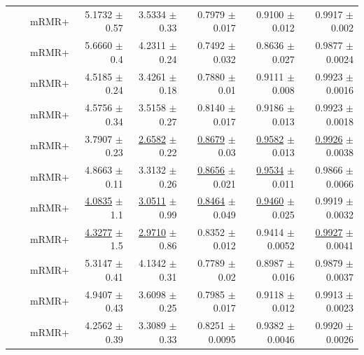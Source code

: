 \begin{longtable}{llp{}rrrrr}
 &  & mRMR+ & 5.1732 {\scriptsize $\pm$ 0.57} & 3.5334 {\scriptsize $\pm$ 0.33} & 0.7979 {\scriptsize $\pm$ 0.017} & 0.9100 {\scriptsize $\pm$ 0.012} & 0.9917 {\scriptsize $\pm$ 0.002} \\
 &  & mRMR+ & 5.6660 {\scriptsize $\pm$ 0.4} & 4.2311 {\scriptsize $\pm$ 0.24} & 0.7492 {\scriptsize $\pm$ 0.032} & 0.8636 {\scriptsize $\pm$ 0.027} & 0.9877 {\scriptsize $\pm$ 0.0024} \\
 &  & mRMR+ & 4.5185 {\scriptsize $\pm$ 0.24} & 3.4261 {\scriptsize $\pm$ 0.18} & 0.7880 {\scriptsize $\pm$ 0.01} & 0.9111 {\scriptsize $\pm$ 0.008} & 0.9923 {\scriptsize $\pm$ 0.0016} \\
 &  & mRMR+ & 4.5756 {\scriptsize $\pm$ 0.34} & 3.5158 {\scriptsize $\pm$ 0.27} & 0.8140 {\scriptsize $\pm$ 0.017} & 0.9186 {\scriptsize $\pm$ 0.013} & 0.9923 {\scriptsize $\pm$ 0.0018} \\
 &  & mRMR+ & 3.7907 {\scriptsize $\pm$ 0.23} & \underline{2.6582} {\scriptsize $\pm$ 0.22} & \underline{0.8679} {\scriptsize $\pm$ 0.03} & \underline{0.9582} {\scriptsize $\pm$ 0.013} & \underline{0.9926} {\scriptsize $\pm$ 0.0038} \\
 &  & mRMR+ & 4.8663 {\scriptsize $\pm$ 0.11} & 3.3132 {\scriptsize $\pm$ 0.26} & \underline{0.8656} {\scriptsize $\pm$ 0.021} & \underline{0.9534} {\scriptsize $\pm$ 0.011} & 0.9866 {\scriptsize $\pm$ 0.0066} \\
 &  & mRMR+ & \underline{4.0835} {\scriptsize $\pm$ 1.1} & \underline{3.0511} {\scriptsize $\pm$ 0.99} & \underline{0.8464} {\scriptsize $\pm$ 0.049} & \underline{0.9460} {\scriptsize $\pm$ 0.025} & 0.9919 {\scriptsize $\pm$ 0.0032} \\
 &  & mRMR+ & \underline{4.3277} {\scriptsize $\pm$ 1.5} & \underline{2.9710} {\scriptsize $\pm$ 0.86} & 0.8352 {\scriptsize $\pm$ 0.012} & 0.9414 {\scriptsize $\pm$ 0.0052} & \underline{0.9927} {\scriptsize $\pm$ 0.0041} \\
 &  & mRMR+ & 5.3147 {\scriptsize $\pm$ 0.41} & 4.1342 {\scriptsize $\pm$ 0.31} & 0.7789 {\scriptsize $\pm$ 0.02} & 0.8987 {\scriptsize $\pm$ 0.016} & 0.9879 {\scriptsize $\pm$ 0.0037} \\
 &  & mRMR+ & 4.9407 {\scriptsize $\pm$ 0.43} & 3.6098 {\scriptsize $\pm$ 0.25} & 0.7985 {\scriptsize $\pm$ 0.017} & 0.9118 {\scriptsize $\pm$ 0.012} & 0.9913 {\scriptsize $\pm$ 0.0023} \\
 &  & mRMR+ & 4.2562 {\scriptsize $\pm$ 0.39} & 3.3089 {\scriptsize $\pm$ 0.33} & 0.8251 {\scriptsize $\pm$ 0.0095} & 0.9382 {\scriptsize $\pm$ 0.0046} & 0.9920 {\scriptsize $\pm$ 0.0026} \\

\end{longtable}
